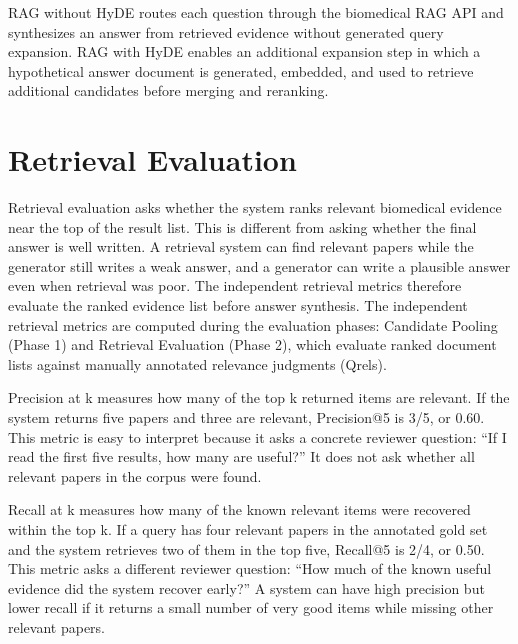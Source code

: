 RAG without HyDE routes each question through the biomedical RAG API and synthesizes an answer from retrieved evidence without generated query expansion. RAG with HyDE enables an additional expansion step in which a hypothetical answer document is generated, embedded, and used to retrieve additional candidates before merging and reranking.

\section{Retrieval Evaluation}

Retrieval evaluation asks whether the system ranks relevant biomedical evidence near the top of the result list. This is different from asking whether the final answer is well written. A retrieval system can find relevant papers while the generator still writes a weak answer, and a generator can write a plausible answer even when retrieval was poor. The independent retrieval metrics therefore evaluate the ranked evidence list before answer synthesis. The independent retrieval metrics are computed during the evaluation phases: Candidate Pooling (Phase 1) and Retrieval Evaluation (Phase 2), which evaluate ranked document lists against manually annotated relevance judgments (Qrels).

Precision at k measures how many of the top k returned items are relevant. If the system returns five papers and three are relevant, Precision@5 is 3/5, or 0.60. This metric is easy to interpret because it asks a concrete reviewer question: ``If I read the first five results, how many are useful?'' It does not ask whether all relevant papers in the corpus were found.

Recall at k measures how many of the known relevant items were recovered within the top k. If a query has four relevant papers in the annotated gold set and the system retrieves two of them in the top five, Recall@5 is 2/4, or 0.50. This metric asks a different reviewer question: ``How much of the known useful evidence did the system recover early?'' A system can have high precision but lower recall if it returns a small number of very good items while missing other relevant papers.

